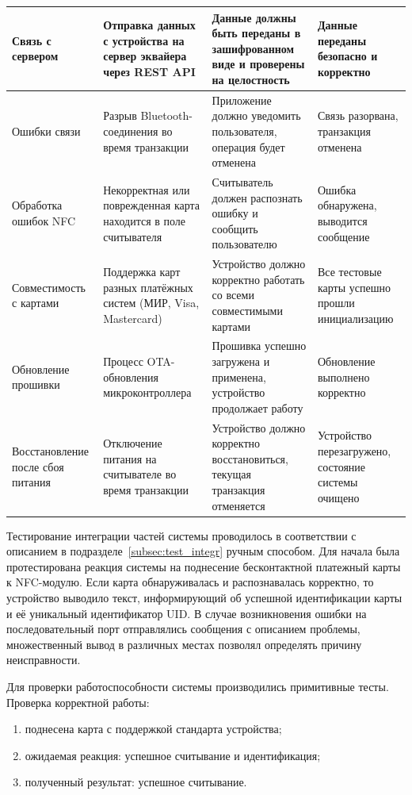 \begin{longtable}[l]{| P{0.2\textwidth} | P{0.3\textwidth} | P{0.2\textwidth} | P{0.2\textwidth}|}
    Связь с сервером &
    Отправка данных с устройства на сервер эквайера через REST API &
    Данные должны быть переданы в зашифрованном виде и проверены на целостность &
    Данные переданы безопасно и корректно \\
    \hline

    Ошибки связи &
    Разрыв Bluetooth-соединения во время транзакции &
    Приложение должно уведомить пользователя, операция будет отменена &
    Связь разорвана, транзакция отменена \\
    \hline

    Обработка ошибок NFC &
    Некорректная или поврежденная карта находится в поле считывателя &
    Считыватель должен распознать ошибку и сообщить пользователю &
    Ошибка обнаружена, выводится сообщение \\
    \hline

    Совместимость с картами &
    Поддержка карт разных платёжных систем (МИР, Visa, Mastercard) &
    Устройство должно корректно работать со всеми совместимыми картами &
    Все тестовые карты успешно прошли инициализацию \\
    \hline

    Обновление прошивки &
    Процесс OTA-обновления микроконтроллера &
    Прошивка успешно загружена и применена, устройство продолжает работу &
    Обновление выполнено корректно \\
    \hline

    Восстановление после сбоя питания &
    Отключение питания на считывателе во время транзакции &
    Устройство должно корректно восстановиться, текущая транзакция отменяется &
    Устройство перезагружено, состояние системы очищено \\
    \hline
\end{longtable}

Тестирование интеграции частей системы проводилось в соответствии с описанием в подразделе~\ref{subsec:test_integr} ручным способом.
Для начала была протестирована реакция системы на поднесение бесконтактной платежный карты к NFC-модулю.
Если карта обнаруживалась и распознавалась корректно, то устройство выводило текст, информирующий об успешной идентификации карты и её уникальный идентификатор UID.
В случае возникновения ошибки на последовательный порт отправлялись сообщения с описанием проблемы, множественный вывод в различных местах позволял определять причину неисправности.

Для проверки работоспособности системы производились примитивные тесты.
Проверка корректной работы:
\begin{enumerate}
    \item поднесена карта с поддержкой стандарта устройства;
    \item ожидаемая реакция: успешное считывание и идентификация;
    \item полученный результат: успешное считывание.
\end{enumerate}

